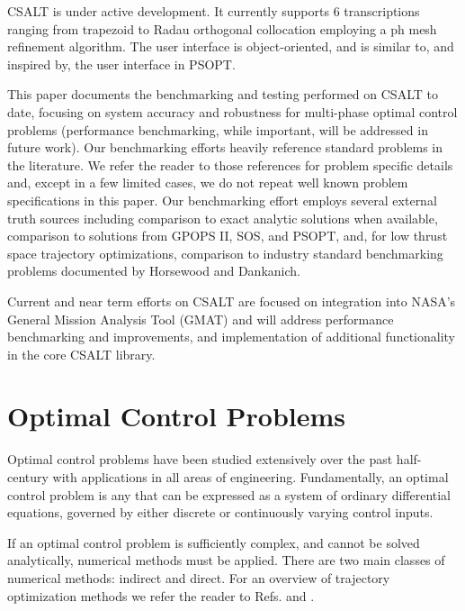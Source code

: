 \documentclass[ISTS  ]{tjsass} %
\begin{document}
CSALT is under active development.  It currently supports 6 transcriptions ranging from trapezoid\cite{Betts:a} to Radau orthogonal collocation\cite{Rao:a} employing a ph mesh refinement algorithm\cite{Rao:c}.  The user interface is object-oriented, and is similar to, and inspired by, the user interface in PSOPT\cite{Becerra:a}.

This paper documents the benchmarking and testing performed on CSALT to date, focusing on system accuracy and robustness for multi-phase optimal control problems (performance benchmarking, while important, will be addressed in future work).  Our benchmarking efforts heavily reference standard problems in the literature.  We refer the reader to those references for problem specific details and, except in a few limited cases, we do not repeat well known problem specifications in this paper. Our benchmarking effort employs several external truth sources including comparison to exact analytic solutions when available, comparison to solutions from GPOPS II\cite{Rao:a}, SOS\cite{Betts:c}, and PSOPT\cite{Becerra:a}, and, for low thrust space trajectory optimizations, comparison to industry standard benchmarking problems documented by Horsewood and Dankanich.\cite{Horsewood:a}

Current and near term efforts on CSALT are focused on integration into NASA’s General Mission Analysis Tool (GMAT) and will address  performance benchmarking and improvements, and implementation of additional functionality in the core CSALT library.

\section{Optimal Control Problems}

Optimal control problems have been studied extensively over the past half-century with applications in all areas of engineering. Fundamentally, an optimal control problem is any that can be expressed as a system of ordinary differential equations, governed by either discrete or continuously varying control inputs.

If an optimal control problem is sufficiently complex, and cannot be solved analytically, numerical methods must be applied. There are two main classes of numerical methods: indirect and direct. For an overview of trajectory optimization methods we refer the reader to Refs.  and .
\end{document}
